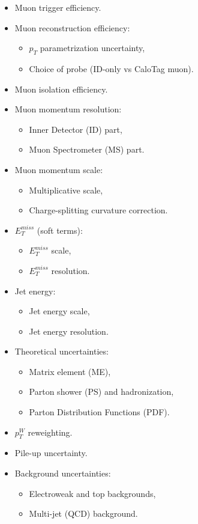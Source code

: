 \begin{itemize}
\item Muon trigger efficiency.
\item Muon reconstruction efficiency:
\begin{itemize}
\item $p_T$ parametrization uncertainty,
\item Choice of probe (ID-only vs CaloTag muon).
\end{itemize}
\item Muon isolation efficiency.
\item Muon momentum resolution:
\begin{itemize}
\item Inner Detector (ID) part,
\item Muon Spectrometer (MS) part.
\end{itemize}
\item Muon momentum scale:
\begin{itemize}
\item Multiplicative scale,
\item Charge-splitting curvature correction.
\end{itemize}
\item $E_{T}^{miss}$ (soft terms):
\begin{itemize}
\item  $E_{T}^{miss}$ scale,
\item $E_{T}^{miss}$ resolution.
\end{itemize}
\item Jet energy:
\begin{itemize}
\item Jet energy scale,
\item Jet energy resolution.
\end{itemize}
\item Theoretical uncertainties:
\begin{itemize}
\item Matrix element (ME),
\item Parton shower (PS) and hadronization,
\item Parton Distribution Functions (PDF).
\end{itemize}
\item $p^{W}_{T}$ reweighting.
\item Pile-up uncertainty.
\item Background uncertainties:
\begin{itemize}
\item Electroweak and top backgrounds,
\item Multi-jet (QCD) background.
\end{itemize}
\end{itemize}

